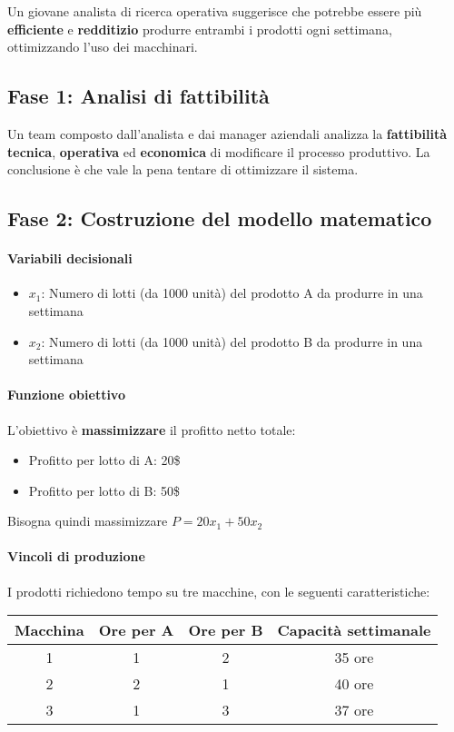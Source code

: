 Un giovane analista di ricerca operativa suggerisce che potrebbe essere più \textbf{efficiente} e \textbf{redditizio} produrre entrambi i prodotti ogni settimana, ottimizzando l'uso dei macchinari.

\subsection{Fase 1: Analisi di fattibilità}
Un team composto dall'analista e dai manager aziendali analizza la \textbf{fattibilità tecnica}, \textbf{operativa} ed \textbf{economica} di modificare il processo produttivo. La conclusione è che vale la pena tentare di ottimizzare il sistema.

\subsection{Fase 2: Costruzione del modello matematico}
\paragraph{\textbf{Variabili decisionali}}
\begin{itemize}
    \item $x_1$: Numero di lotti (da 1000 unità) del prodotto A da produrre in una settimana
    \item $x_2$: Numero di lotti (da 1000 unità) del prodotto B da produrre in una settimana
\end{itemize}

\paragraph{\textbf{Funzione obiettivo}}
L'obiettivo è \textbf{massimizzare} il profitto netto totale:
\begin{itemize}
    \item Profitto per lotto di A: 20\$
    \item Profitto per lotto di B: 50\$
\end{itemize}
Bisogna quindi massimizzare $P=20x_1+50x_2$

\paragraph{\textbf{Vincoli di produzione}}
I prodotti richiedono tempo su tre macchine, con le seguenti caratteristiche:

\begin{table}[h]
\centering
\begin{tabular}{|c|c|c|c|}
\hline
\textbf{Macchina} & \textbf{Ore per A} & \textbf{Ore per B} & \textbf{Capacità settimanale} \\
\hline
1 & 1 & 2 & 35 ore \\
\hline
2 & 2 & 1 & 40 ore \\
\hline
3 & 1 & 3 & 37 ore \\
\hline
\end{tabular}
\end{table}

